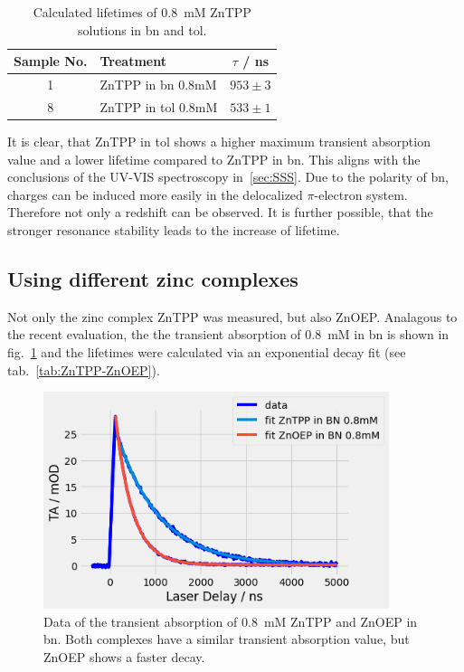 \begin{table}[ht]
    \centering
    \begin{tabular}{clc}
        \toprule
        Sample No. &    Treatment &    $\tau$ / \si{\nano\second} \\
        \midrule
        1 &     ZnTPP in bn 0.8mM &  $953 \pm 3$ \\
        8 &    ZnTPP in tol 0.8mM &  $533 \pm 1$ \\
        \bottomrule
    \end{tabular}
    \caption{Calculated lifetimes of \SI{0.8}{\milli\nauticalmile} ZnTPP solutions in bn and tol.}
    \label{tab:ZnTPP-bn-tol}
\end{table}

It is clear, that ZnTPP in tol shows a higher maximum transient absorption value and a lower lifetime compared to ZnTPP in bn. This aligns with the conclusions of the UV-VIS spectroscopy in~\ref{sec:SSS}. Due to the polarity of bn, charges can be induced more easily in the delocalized $\pi$-electron system. Therefore not only a redshift can be observed. It is further possible, that the stronger resonance stability leads to the increase of lifetime.

\subsection*{Using different zinc complexes}
Not only the zinc complex ZnTPP was measured, but also ZnOEP. Analagous to the recent evaluation, the the transient absorption of \SI{0.8}{\milli\nauticalmile} in bn is shown in fig.~\ref{fig:ZnTPP-ZnOEP} and the lifetimes were calculated via an exponential decay fit (see tab.~\ref{tab:ZnTPP-ZnOEP}).

\begin{figure}[h]
    \centering
    \includegraphics[width = 0.9\textwidth]{Bilder/Auswertung/TRAS/ZnTPP-ZnOEP.png}
    \caption{Data of the transient absorption of \SI{0.8}{\milli\nauticalmile} ZnTPP and ZnOEP in bn. Both complexes have a similar transient absorption value, but ZnOEP shows a faster decay.}
    \label{fig:ZnTPP-ZnOEP}
\end{figure}


